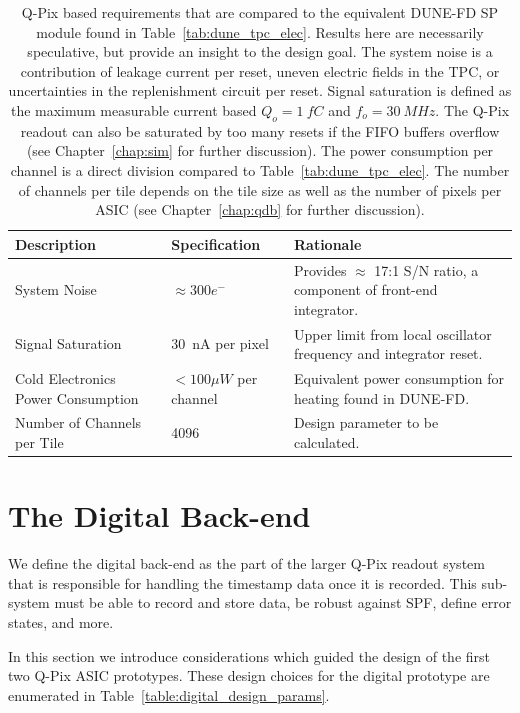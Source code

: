 \begin{table}
\begin{center}
\begin{tabular}{|| p{40mm} | p{40mm} | p{70mm} ||}
 \hline
 Description & Specification & Rationale \\ [0.5ex]
 \hline\hline
  System Noise & $\approx 300 e^{-}$ & Provides $\approx$ 17:1 S/N ratio, a component of front-end integrator. \\
 \hline
  Signal Saturation & 30~\unit{nA} per pixel & Upper limit from local oscillator frequency and integrator reset. \\
 \hline
  Cold Electronics Power Consumption & $< 100 \unit{\mu W}$ per channel & Equivalent power consumption for heating found in DUNE-FD. \\
 \hline
  Number of Channels per Tile & 4096 & Design parameter to be calculated. \\
 \hline
\end{tabular}
\caption{Q-Pix based requirements that are compared to the equivalent DUNE-FD SP module found in Table~\ref{tab:dune_tpc_elec}.
Results here are necessarily speculative, but provide an insight to the design goal.
The system noise is a contribution of leakage current per reset, uneven electric fields in the TPC, or uncertainties in the replenishment circuit per reset.
Signal saturation is defined as the maximum measurable current based $Q_{o} = 1~\unit{fC}$ and $f_{o} = 30~\unit{MHz}$.
The Q-Pix readout can also be saturated by too many resets if the FIFO buffers overflow (see Chapter~\ref{chap:sim} for further discussion).
The power consumption per channel is a direct division compared to Table~\ref{tab:dune_tpc_elec}.
The number of channels per tile depends on the tile size as well as the number of pixels per ASIC (see Chapter~\ref{chap:qdb} for further discussion).
}
\label{tab:qpix_tpc_elec}
\end{center}
\end{table}

\section{The Digital Back-end}
\label{sec:digital_back-end}
We define the digital back-end as the part of the larger Q-Pix readout system that is responsible for handling the timestamp data once it is recorded.
This sub-system must be able to record and store data, be robust against SPF, define error states, and more.

In this section we introduce considerations which guided the design of the first two Q-Pix ASIC prototypes.
These design choices for the digital prototype are enumerated in Table~\ref{table:digital_design_params}.

